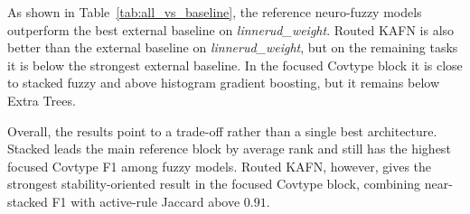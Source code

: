 \documentclass[runningheads]{llncs}
\begin{document}
\begin{table}[H]
\centering
\caption{Reference neuro-fuzzy architectures and Routed KAFN against the best external baseline per data set (signed delta; positive is better). For RMSE, positive means lower error than the baseline; for F1, positive means higher F1. The Covtype row uses the focused three-seed block.}
\label{tab:all_vs_baseline}
\scriptsize
\setlength{\tabcolsep}{3pt}
\end{table}

As shown in Table~\ref{tab:all_vs_baseline}, the reference neuro-fuzzy models outperform the best external baseline on \textit{linnerud\_weight}. Routed KAFN is also better than the external baseline on \textit{linnerud\_weight}, but on the remaining tasks it is below the strongest external baseline. In the focused Covtype block it is close to stacked fuzzy and above histogram gradient boosting, but it remains below Extra Trees.

Overall, the results point to a trade-off rather than a single best architecture. Stacked leads the main reference block by average rank and still has the highest focused Covtype F1 among fuzzy models. Routed KAFN, however, gives the strongest stability-oriented result in the focused Covtype block, combining near-stacked F1 with active-rule Jaccard above $0.91$.
\end{document}
